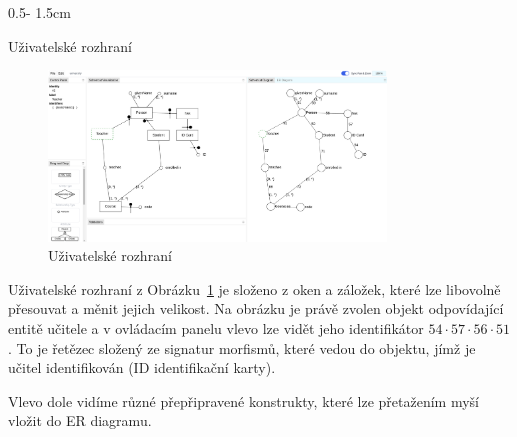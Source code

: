 \documentclass[a0paper]{uioposter}
\begin{document}
\begin{frame}
\begin{columns}[onlytextwidth]
    \begin{column}{0.5\textwidth - 1.5cm}
      \begin{block}{Uživatelské rozhraní}
        \begin{figure}
          \centering
          \includegraphics[width=0.8\textwidth]{./images/identifier-screenshot.png}
          \caption{Uživatelské rozhraní}
          \label{fig:user-interface}
        \end{figure}

        Uživatelské rozhraní z Obrázku~\ref{fig:user-interface} je složeno z oken a záložek, které lze libovolně přesouvat a měnit jejich velikost.
        Na obrázku je právě zvolen objekt odpovídající entitě učitele a v ovládacím panelu vlevo lze vidět jeho identifikátor $54\cdot 57\cdot 56\cdot 51$.
        To je řetězec složený ze signatur morfismů, které vedou do objektu, jímž je učitel identifikován (ID identifikační karty).

        Vlevo dole vidíme různé přepřipravené konstrukty, které lze přetažením myší vložit do ER diagramu.


\end{block}
\end{column}
\end{columns}
\end{frame}
\end{document}
